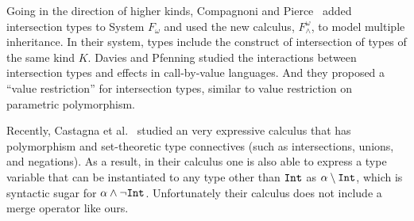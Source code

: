 



%

Going in the direction of higher
kinds, Compagnoni and Pierce~\cite{compagnoni1996higher} added
intersection types to System $ F_{\omega} $ and used the new calculus,
$ F^{\omega}_{\wedge} $, to model multiple inheritance. In their
system, types include the construct of intersection of types of the
same kind $ K $. Davies and Pfenning
\cite{davies2000intersection} studied the interactions between
intersection types and effects in call-by-value languages. And they
proposed a ``value restriction'' for intersection types, similar to
value restriction on parametric polymorphism.

Recently, Castagna et al.~\cite{Castagna:2014} studied an very expressive
calculus that has polymorphism and set-theoretic type connectives (such as
intersections, unions, and negations). As a result, in their calculus one is
also able to express a type variable that can be instantiated to any type other
than $\texttt{Int}$ as $\alpha \setminus \texttt{Int}$, which is syntactic sugar for
$\alpha \wedge \neg \texttt{Int}$. Unfortunately their calculus does not include a
merge operator like ours.


